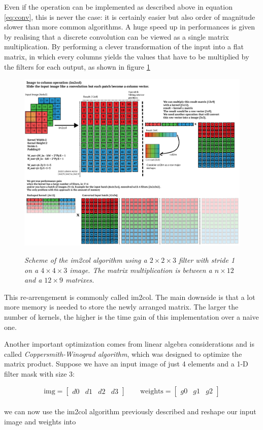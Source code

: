 \documentclass[12pt,a4paper]{report}
\begin{document}
Even if the operation can be implemented as described above in equation \ref{eq:conv}, this is never the case: it is certainly easier but also order of magnitude slower than more common algorithms.
A huge speed up in performances is given by realising that a discrete convolution can be viewed as a single matrix multiplication. By performing a clever transformation of the input into a flat matrix, in which every columns yields the values that have to be multiplied by the filters for each output, as shown in figure \ref{fig:im2col}

\begin{figure}[h]
 \centering
 \includegraphics[scale=0.35]{./images/im2col.png}
 \label{fig:im2col}
 \caption{\it Scheme of the im2col algorithm using a $2 \times 2 \times 3$ filter with stride 1 on a $4 \times 4 \times 3$ image. The matrix multiplication is between a $n \times 12$ and a $12 \times 9$ matrixes.}
\end{figure}

This re-arrengement is commonly called im2col. The main downside is that a lot more memory is needed to store the newly arranged matrix.
The larger the number of kernels, the higher is the time gain of this implementation over a naive one.  

Another important optimization comes from linear algebra considerations and is called {\it Coppersmith-Winograd algorithm}, which was designed to optimize the matrix product.
Suppose we have an input image of just 4 elements and a 1-D filter mask with size 3:

\begin{equation}
\mbox{img} = \left[\begin{array}{cccc} d0 & d1 & d2 & d3 \end{array}\right] \quad\quad \mbox{weights} = \left[\begin{array}{ccc} g0 & g1 & g2 \end{array}\right]
\end{equation}
\\
we can now use the \textsf{im2col} algorithm previously described and reshape our input image and weights into
\end{document}
